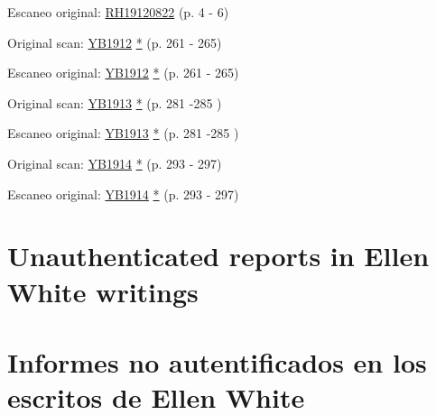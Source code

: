 Escaneo original: \href{https://adventistdigitallibrary.org/adl-351682/advent-review-and-sabbath-herald-august-22-1912?view_only=true&solr_nav%5Bid%5D=ff4d7f3f77b9bdf9e9ac&solr_nav%5Bpage%5D=0&solr_nav%5Boffset%5D=15}{RH19120822} (p. 4 - 6)






Original scan: \href{https://documents.adventistarchives.org/Yearbooks/YB1912.pdf#search=Yearbook%201910}{YB1912} \href{https://forgotten-pillar.s3.us-east-2.amazonaws.com/YB1912.pdf}{*} (p. 261 - 265)


Escaneo original: \href{https://documents.adventistarchives.org/Yearbooks/YB1912.pdf#search=Yearbook%201910}{YB1912} \href{https://forgotten-pillar.s3.us-east-2.amazonaws.com/YB1912.pdf}{*} (p. 261 - 265)






Original scan: \href{https://documents.adventistarchives.org/Yearbooks/YB1913.pdf#search=Yearbook%201913}{YB1913} \href{https://forgotten-pillar.s3.us-east-2.amazonaws.com/YB1913.pdf}{*} (p. 281 -285 )


Escaneo original: \href{https://documents.adventistarchives.org/Yearbooks/YB1913.pdf#search=Yearbook%201913}{YB1913} \href{https://forgotten-pillar.s3.us-east-2.amazonaws.com/YB1913.pdf}{*} (p. 281 -285 )


Original scan: \href{https://documents.adventistarchives.org/Yearbooks/YB1914.pdf#search=Yearbook%201914}{YB1914} \href{https://forgotten-pillar.s3.us-east-2.amazonaws.com/YB1914.pdf}{*} (p. 293 - 297)


Escaneo original: \href{https://documents.adventistarchives.org/Yearbooks/YB1914.pdf#search=Yearbook%201914}{YB1914} \href{https://forgotten-pillar.s3.us-east-2.amazonaws.com/YB1914.pdf}{*} (p. 293 - 297)


\section*{Unauthenticated reports in Ellen White writings}


\section*{Informes no autentificados en los escritos de Ellen White}


